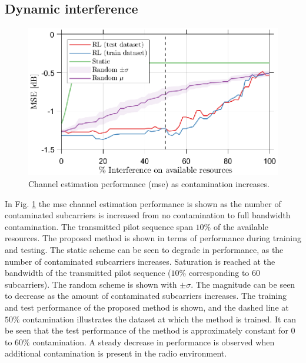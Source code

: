 \subsection{Dynamic interference}\label{subsec:RL_results_B}
\begin{figure}
    \centering
    \includegraphics{chapters/part_uplink/figures/results/MSE_Interference.eps}
    \caption{Channel estimation performance (\gls{mse}) as contamination increases.}
    \label{fig:RL_MSE_Interference}
\end{figure}
In Fig. \ref{fig:RL_MSE_Interference} the \gls{mse} channel estimation performance is shown as the number of contaminated subcarriers is increased from no contamination to full bandwidth contamination. The transmitted pilot sequence span $10\%$ of the available resources. The proposed method is shown in terms of performance during training and testing. The static scheme can be seen to degrade in performance, as the number of contaminated subcarriers increases. Saturation is reached at the bandwidth of the transmitted pilot sequence ($10\%$ corresponding to $60$ subcarriers). The random scheme is shown with $\pm \sigma$. The magnitude can be seen to decrease as the amount of contaminated subcarriers increases. The training and test performance of the proposed method is shown, and the dashed line at $50\%$ contamination illustrates the dataset at which the method is trained. It can be seen that the test performance of the method is approximately constant for $0$ to $60\%$ contamination. A steady decrease in performance is observed when additional contamination is present in the radio environment. 

